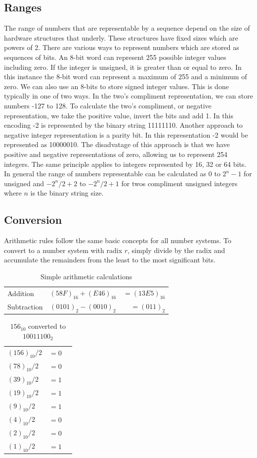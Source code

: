 \documentclass[10pt,a4paper]{article}
\begin{document}
\subsection{Ranges}
The range of numbers that are representable by a sequence depend on the size of hardware structures that underly. These structures have fixed sizes which are powers of 2. There are various ways to represent numbers which are stored as sequences of bits. An 8-bit word can represent 255 possible integer values including zero. If the integer is unsigned, it is greater than or equal to zero. In this instance the 8-bit word can represent a maximum of 255 and a minimum of zero. We can also use an 8-bits to store signed integer values. This is done typically in one of two ways. In the two's compliment representation, we can store numbers -127 to 128. To calculate the two's compliment, or negative representation, we take the positive value, invert the bits and add 1. In this encoding -2 is represented by the binary string 11111110. Another approach to negative integer representation is a parity bit. In this representation -2 would be represented as 10000010. The disadvatage of this approach is that we have positive and negative representations of zero, allowing us to represent 254 integers.
\newline\newline
The same principle applies to integers represented by 16, 32 or 64 bits. In general the range of numbers representable can be calculated as $0$ to $2^{n} -1$ for unsigned and $-2^{n}/2 + 2$ to $-2^{n}/2 + 1$ for twos compliment unsigned integers where $n$ is the binary string size.    
\subsection{Conversion}
Arithmetic rules follow the same basic concepts for all number systems. To convert to a number system with radix $r$, simply divide by the radix and accumulate the remainders from the least to the most significant bits. 
\begin{table}
\centering
\begin{tabular}{ l c r }
  Addition    & $(58F)_{16} + (E46)_{16}$ & $= (13E5)_{16}$ \\
  Subtraction & $(0101)_2 -(0010)_2$ & $= (011)_2$ \\
\end{tabular}
\caption{Simple arithmetic calculations}
\end{table}
\begin{table}
\centering
\begin{tabular}{ l c r }
  $(156)_{10} / 2$ & $=0$ \\
  $(78)_{10} / 2$ & $=0$  \\
  $(39)_{10} / 2$ & $=1$  \\  
  $(19)_{10} / 2$ & $=1$  \\  
  $(9)_{10} / 2$ & $=1$ \\  
  $(4)_{10} / 2$ & $=0$ \\  
  $(2)_{10} / 2$ & $=0$ \\  
  $(1)_{10} / 2$ & $=1$ \\
\end{tabular}
\caption{$156_{10}$ converted to $10011100_{2}$}
\end{table}
\end{document}
